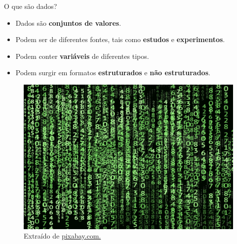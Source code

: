 \documentclass[
  ignorenonframetext,
  serif,
  professionalfont,
  usenames,
  dvipsnames,
  aspectratio = 169]{beamer}
\providecommand{\tightlist}{%
  \setlength{\itemsep}{0pt}\setlength{\parskip}{0pt}}
\renewcommand{\tightlist}{%
  \setlength{\itemsep}{0\baselineskip}
  \setlength{\parskip}{0.25\baselineskip}
}
\def\beginAHalfColumn{\begin{minipage}{0.49\textwidth}}%
\def\endColumns{\end{minipage}}%
\begin{document}
\begin{frame}{O que são dados?}
\label{o-que-suxe3o-dados}
\beginAHalfColumn

\begin{itemize}
\tightlist
\item
  Dados são \textbf{conjuntos de valores}.
\end{itemize}

\vspace{0.3cm}

\begin{itemize}
\tightlist
\item
  Podem ser de diferentes fontes, tais como \textbf{estudos} e
  \textbf{experimentos}.
\end{itemize}

\vspace{0.3cm}

\begin{itemize}
\tightlist
\item
  Podem conter \textbf{variáveis} de diferentes tipos.
\end{itemize}

\vspace{0.3cm}

\begin{itemize}
\tightlist
\item
  Podem surgir em formatos \textbf{estruturados} e
  \textbf{não estruturados}.
\end{itemize}

\endColumns
\beginAHalfColumn

\begin{figure}

{\centering \includegraphics[width=0.9\linewidth]{./img/dados} 

}

\caption{Extraído de \href{https://cdn.pixabay.com/photo/2018/01/26/18/21/matrix-3109378_1280.jpg}{pixabay.com.}}\label{fig:unnamed-chunk-22}
\end{figure}

\endColumns
\end{frame}
\end{document}
